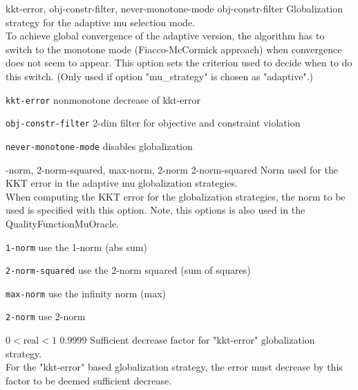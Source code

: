 %
{\ttfamily kkt-error, obj-constr-filter, never-monotone-mode}%
{obj-constr-filter}%
{Globalization strategy for the adaptive mu selection mode.\\
To achieve global convergence of the adaptive version, the algorithm has to switch to the monotone mode (Fiacco-McCormick approach) when convergence does not seem to appear.  This option sets the criterion used to decide when to do this switch. (Only used if option "mu\_strategy" is chosen as "adaptive".)}%
{\begin{list}{}{
\setlength{\parsep}{0em}
\setlength{\leftmargin}{5ex}
\setlength{\labelwidth}{2ex}
\setlength{\itemindent}{0ex}
\setlength{\topsep}{0pt}}
\item[\texttt{kkt-error}] nonmonotone decrease of kkt-error
\item[\texttt{obj-constr-filter}] 2-dim filter for objective and constraint violation
\item[\texttt{never-monotone-mode}] disables globalization
\end{list}
}

%
{-norm, 2-norm-squared, max-norm, 2-norm}%
{2-norm-squared}%
{Norm used for the KKT error in the adaptive mu globalization strategies.\\
When computing the KKT error for the globalization strategies, the norm to be used is specified with this option. Note, this options is also used in the QualityFunctionMuOracle.}%
{\begin{list}{}{
\setlength{\parsep}{0em}
\setlength{\leftmargin}{5ex}
\setlength{\labelwidth}{2ex}
\setlength{\itemindent}{0ex}
\setlength{\topsep}{0pt}}
\item[\texttt{1-norm}] use the 1-norm (abs sum)
\item[\texttt{2-norm-squared}] use the 2-norm squared (sum of squares)
\item[\texttt{max-norm}] use the infinity norm (max)
\item[\texttt{2-norm}] use 2-norm
\end{list}
}

%
{$0<\textrm{real}<1$}%
{$0.9999$}%
{Sufficient decrease factor for "kkt-error" globalization strategy.\\
For the "kkt-error" based globalization strategy, the error must decrease by this factor to be deemed sufficient decrease.}%
{}

